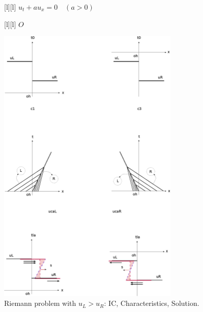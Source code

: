 \begin{figure}[ht]
	[l] {$\displaystyle u_{t} + au_{x} = 0 \quad (a>0)$}





	[l] {$O$}

	\includegraphics[width=0.77\textwidth]{RiemannAllCasesLR_set1.eps}
	\caption{Riemann problem with $u_{L} >u_{R}$:  IC, Characteristics, Solution.}
	\label{\LABEL}
\end{figure}